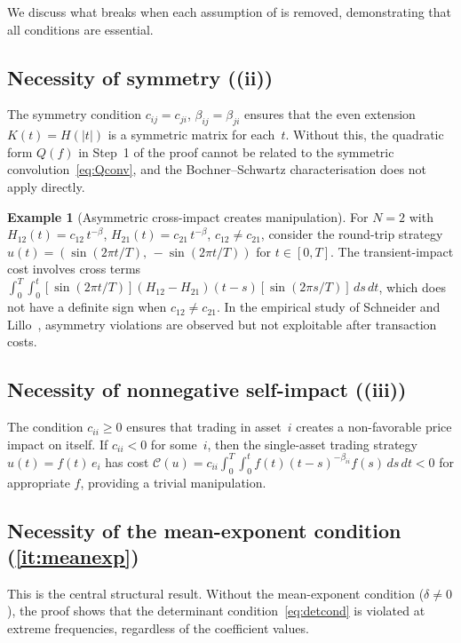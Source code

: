 \documentclass[12pt]{article}
\theoremstyle{definition}
\newtheorem{example}[theorem]{Example}
\theoremstyle{remark}
\begin{document}
We discuss what breaks when each assumption of  is removed,
demonstrating that all conditions are essential.

\subsection{Necessity of symmetry ((ii))}

The symmetry condition $c_{ij}=c_{ji}$, $\beta_{ij}=\beta_{ji}$ ensures
that the even extension $K(t)=H(|t|)$ is a symmetric matrix for each~$t$.
Without this, the quadratic form $Q(f)$ in Step~1 of the proof cannot be
related to the symmetric convolution~\eqref{eq:Qconv}, and the Bochner--Schwartz
characterisation does not apply directly.

\begin{example}[Asymmetric cross-impact creates manipulation]\label{ex:asymmetric}
For $N=2$ with $H_{12}(t) = c_{12}\,t^{-\beta}$, $H_{21}(t) = c_{21}\,t^{-\beta}$,
$c_{12}\neq c_{21}$, consider the round-trip strategy
$u(t) = (\sin(2\pi t/T),\,-\sin(2\pi t/T))$ for $t\in[0,T]$.
The transient-impact cost involves cross terms
$\int_0^T\!\int_0^t [\sin(2\pi t/T)](H_{12}-H_{21})(t-s)[\sin(2\pi s/T)]\,ds\,dt$,
which does not have a definite sign when $c_{12}\neq c_{21}$.
In the empirical study of Schneider and Lillo~\cite{SchneiderLillo2019},
asymmetry violations are observed but not exploitable after transaction costs.
\end{example}

\subsection{Necessity of nonnegative self-impact ((iii))}

The condition $c_{ii}\ge 0$ ensures that trading in asset~$i$ creates a
non-favorable price impact on itself.  If $c_{ii}<0$ for some~$i$, then
the single-asset trading strategy $u(t) = f(t)\,e_i$ has cost
$\mathcal{C}(u) = c_{ii}\int_0^T\!\int_0^t f(t)(t-s)^{-\beta_{ii}}f(s)\,ds\,dt < 0$
for appropriate $f$, providing a trivial manipulation.

\subsection{Necessity of the mean-exponent condition (\ref{it:meanexp})}

This is the central structural result.  Without the mean-exponent condition
($\delta\neq 0$), the proof shows that the determinant condition~\eqref{eq:detcond}
is violated at extreme frequencies, regardless of the coefficient values.
\end{document}
